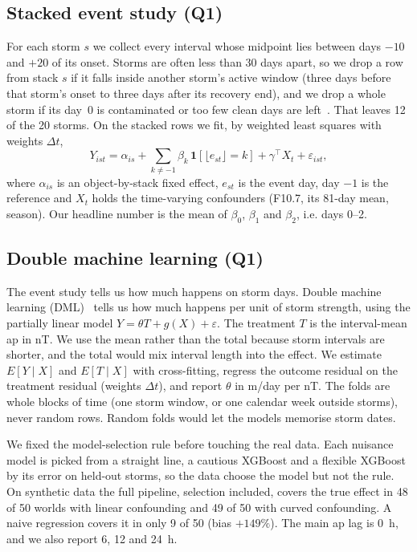 \subsection{Stacked event study (Q1)}
For each storm $s$ we collect every interval whose
midpoint lies between days $-10$ and $+20$ of its onset. Storms are often less than 30 days
apart, so we drop a row from stack $s$ if it falls inside another storm's active window (three
days before that storm's onset to three days after its recovery end), and we drop a whole storm
if its day~0 is contaminated or too few clean days are
left~\cite{cengiz2019stacked,callaway2021did}. That leaves 12 of the 20 storms. On the stacked
rows we fit, by weighted least squares with weights $\Delta t$,
\begin{equation}
Y_{ist} = \alpha_{is} + \sum_{k\neq -1} \beta_k\,\mathbf{1}[\lfloor e_{st}\rfloor = k]
+ \gamma^\top X_t + \varepsilon_{ist},
\end{equation}
where $\alpha_{is}$ is an object-by-stack fixed effect, $e_{st}$ is the event day, day $-1$ is
the reference and $X_t$ holds the time-varying confounders (F10.7, its 81-day mean, season). Our
headline number is the mean of $\beta_0$, $\beta_1$ and $\beta_2$, i.e. days 0--2.

\subsection{Double machine learning (Q1)}
The event study tells us how much happens on storm days. Double machine learning
(DML)~\cite{chernozhukov2018dml} tells us how much happens per unit of storm strength, using the
partially linear model $Y = \theta T + g(X) + \varepsilon$. The treatment $T$ is the
interval-mean ap in nT. We use the mean rather than the total because storm intervals are
shorter, and the total would mix interval length into the effect. We estimate $E[Y\mid X]$ and
$E[T\mid X]$ with cross-fitting, regress the outcome residual on the treatment residual (weights
$\Delta t$), and report $\theta$ in m/day per nT. The folds are whole blocks of time (one storm
window, or one calendar week outside storms), never random rows. Random folds would let the
models memorise storm dates.

We fixed the model-selection rule before touching the real data. Each nuisance model is picked
from a straight line, a cautious XGBoost and a flexible XGBoost by its error on held-out storms,
so the data choose the model but not the rule. On synthetic data the full pipeline, selection
included, covers the true effect in 48 of 50 worlds with linear confounding and 49 of 50 with
curved confounding. A naive regression covers it in only 9 of 50 (bias $+149\%$). The main ap
lag is 0~h, and we also report 6, 12 and 24~h.

